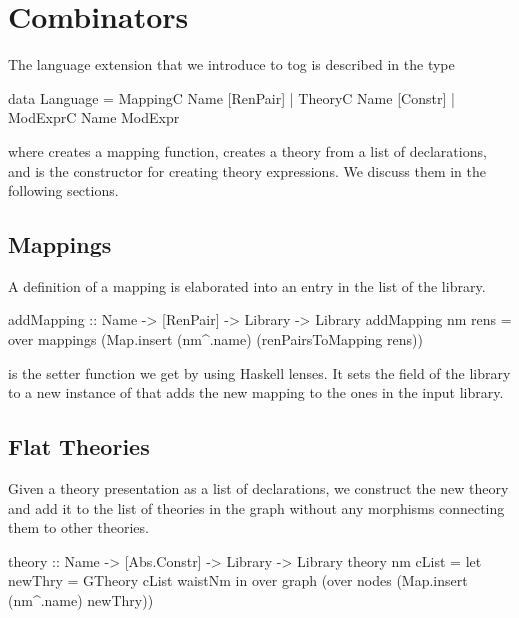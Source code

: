\section{Combinators}
\label{subsec:combinatorsImpl}
The language extension that we introduce to tog is described in the type  
\begin{togcode}
data Language = 
    MappingC Name [RenPair]
  | TheoryC Name [Constr]
  | ModExprC Name ModExpr
\end{togcode}
\noindent where  creates a mapping function,  creates a theory from a list of declarations, and  is the constructor for creating theory expressions. We discuss them in the following sections. 


\subsection{Mappings}
A definition of a mapping is elaborated into an entry in the  list of the library. 
\begin{hscode}
addMapping :: Name -> [RenPair] -> Library -> Library
addMapping nm rens = 
   over mappings (Map.insert (nm^.name) (renPairsToMapping rens))
\end{hscode}
\noindent {} is the setter function we get by using Haskell lenses. It sets the  field of the library to a new instance of  that adds the new mapping to the ones in the input library. 

\subsection{Flat Theories}
Given a theory presentation as a list of declarations, we construct the new theory and add it to the list of theories in the graph without any morphisms connecting them to other theories. 
\begin{hscode}
theory :: Name -> [Abs.Constr] -> Library -> Library
theory nm cList =
  let newThry  = GTheory cList waistNm
  in  over graph (over nodes (Map.insert (nm^.name) newThry))
\end{hscode}


